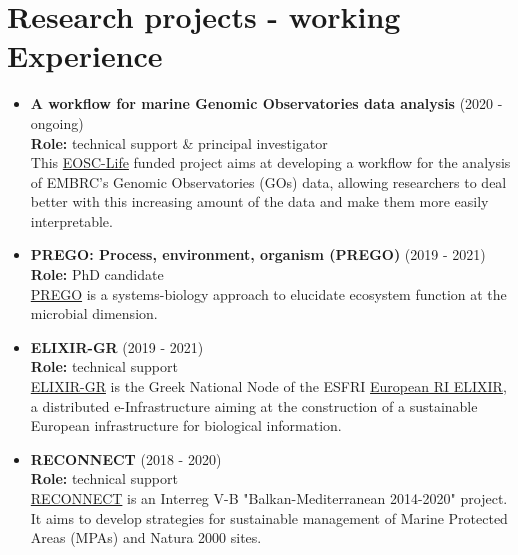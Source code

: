 \section*{Research projects - working Experience}

\begin{itemize}

   \item {
      \textbf{A workflow for marine Genomic Observatories data analysis} (2020 - ongoing) \\
      \textbf{Role:} technical support \& principal investigator \\ 
      This \href{https://www.eosc-life.eu/opencall/}{EOSC-Life} funded project aims at 
      developing a workflow for the analysis of EMBRC's Genomic Observatories (GOs) data, allowing researchers to deal better with this increasing amount of the data and make them more easily interpretable.
   }


   \item{
      \textbf{PREGO: Process, environment, organism (PREGO)} (2019 - 2021) \\ 
      \textbf{Role:} PhD candidate \\
      \href{http://prego.hcmr.gr/}{PREGO} is a systems-biology approach to elucidate ecosystem function at the microbial dimension.
   }

   \item {
      \textbf{ELIXIR-GR} (2019 - 2021) \\ 
      \textbf{Role:} technical support \\
      {\href{https://elixir-greece.org}{ELIXIR-GR}} is the Greek National Node of the ESFRI \href{https://elixir-europe.org/}{European RI ELIXIR}, 
      a distributed e-Infrastructure aiming at the construction of a sustainable European infrastructure for biological information.}

   \item{
      \textbf{RECONNECT} (2018 - 2020) \\
      \textbf{Role:} technical support \\ 
      \href{https://reconnect.hcmr.gr/}{RECONNECT} is an Interreg V-B "Balkan-Mediterranean 2014-2020" project. 
      It aims to develop strategies for sustainable management of Marine Protected Areas (MPAs) and Natura 2000 sites.   
   }

\end{itemize}



